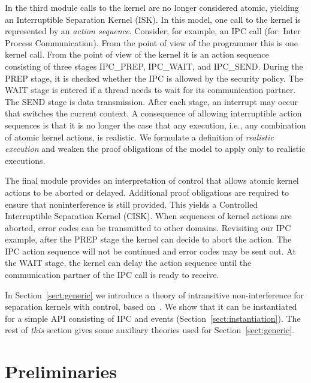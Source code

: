 \documentclass[11pt,a4paper]{article}
\begin{document}
In the third module calls to the kernel are no longer considered atomic, 
yielding an Interruptible Separation Kernel (ISK).
In this model, one call to the kernel is represented by an \emph{action sequence}.
Consider, for example, an IPC call (for: Inter Process Communication). From the 
point of view of the programmer this is one kernel call. From the point of view 
of the kernel it is an action sequence consisting of three stages 
IPC\_PREP, IPC\_WAIT, and IPC\_SEND. 
During the PREP stage, it is checked whether the IPC is allowed by the security 
policy.
The WAIT stage is entered if a thread needs to wait for its communication partner.
The SEND stage is data transmission.
After each stage, an interrupt may occur that switches the current context.
A consequence of allowing interruptible action sequences is that it is no longer 
the case that any execution, i.e., any combination of atomic kernel actions, is 
realistic. We formulate a definition of \emph{realistic execution} and weaken 
the proof obligations of the model to apply only to realistic executions.

The final module provides an interpretation of control that allows atomic kernel 
actions to be aborted or delayed.
Additional proof obligations are required to ensure that noninterference is still 
provided.
This yields a Controlled Interruptible Separation Kernel (CISK).
When sequences of kernel actions are aborted, error codes can be transmitted to 
other domains.
Revisiting our IPC example, after the PREP stage the kernel can decide to abort 
the action. The IPC action sequence will not be continued and error codes may be 
sent out.
At the WAIT stage, the kernel can delay the action sequence until the communication 
partner of the IPC call is ready to receive.



In Section~\ref{sect:generic} we introduce a theory of intransitive 
non-interference for separation kernels with control, based on~\cite{Verbeek2013}. 
We show that it can be instantiated for a simple API consisting of IPC and 
events (Section~\ref{sect:instantiation}). The rest of {\em this} section gives 
some auxiliary theories used for Section~\ref{sect:generic}.

\section{Preliminaries}


\end{document}
